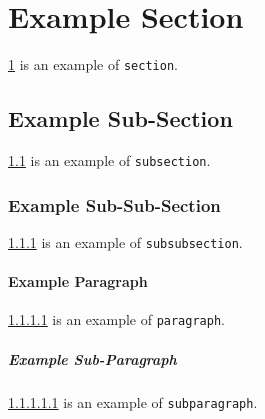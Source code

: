 \section{Example Section}
\label{sec:example-section}

\ref{sec:example-section} is an example of \texttt{section}.

\subsection{Example Sub-Section}
\label{sec:example-subsection}

\ref{sec:example-subsection} is an example of \texttt{subsection}.

\subsubsection{Example Sub-Sub-Section}
\label{sec:example-subsubsection}

\ref{sec:example-subsubsection} is an example of \texttt{subsubsection}.

\paragraph{Example Paragraph}
\label{sec:example-paragraph}

\ref{sec:example-paragraph} is an example of \texttt{paragraph}.

\subparagraph{Example Sub-Paragraph}
\label{sec:example-subparagraph}

\ref{sec:example-subparagraph} is an example of \texttt{subparagraph}.